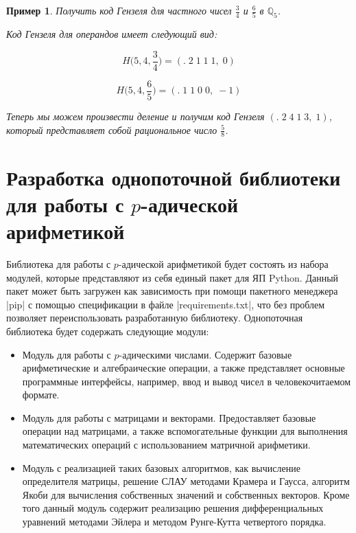 \documentclass[master, och, diploma, times]{sty/SCWorks}
\theoremstyle{plain}
\newtheorem{exmp}{Пример}[section]
\theoremstyle{definition}
\numberwithin{equation}{section}
\begin{document}
\begin{exmp}
Получить код Гензеля для частного чисел $\frac{3}{4}$ и $\frac{6}{5}$ в $\mathbb{Q}_5$.

\noindent Код Гензеля для операндов имеет следующий вид:

$$H\bigg(5,4, \frac{3}{4}\bigg)=(.\; 2\; 1\; 1\; 1,\; 0)$$

$$H\bigg(5,4, \frac{6}{5}\bigg)=(.\; 1\; 1\; 0\; 0,\; -1)$$

\noindent Теперь мы можем произвести деление и получим код Гензеля $(.\; 2\; 4\; 1\; 3,\; 1)$, который представляет собой рациональное число $\frac{5}{8}$.
\end{exmp}

\section{Разработка однопоточной библиотеки для работы с $p$-адической арифметикой}

Библиотека для работы с $p$-адической арифметикой будет состоять из набора модулей, которые представляют из себя единый пакет для ЯП Python. Данный пакет может быть загружен как зависимость при помощи пакетного менеджера |pip| с помощью спецификации в файле |requirements.txt|, что без проблем позволяет переиспользовать разработанную библиотеку. Однопоточная библиотека будет содержать следующие модули:

\begin{itemize}
\item Модуль для работы с $p$-адическими числами. Содержит базовые арифметические и алгебраические операции, а также представляет основные программные интерфейсы, например, ввод и вывод чисел в человекочитаемом формате.
\item Модуль для работы с матрицами и векторами. Предоставляет базовые операции над матрицами, а также вспомогательные функции для выполнения математических операций с использованием матричной арифметики.
\item Модуль с реализацией таких базовых алгоритмов, как вычисление определителя матрицы, решение СЛАУ методами Крамера и Гаусса, алгоритм Якоби для вычисления собственных значений и собственных векторов. Кроме того данный модуль содержит реализацию решения дифференциальных уравнений методами Эйлера и методом Рунге-Кутта четвертого порядка.
\end{itemize}
\end{document}

